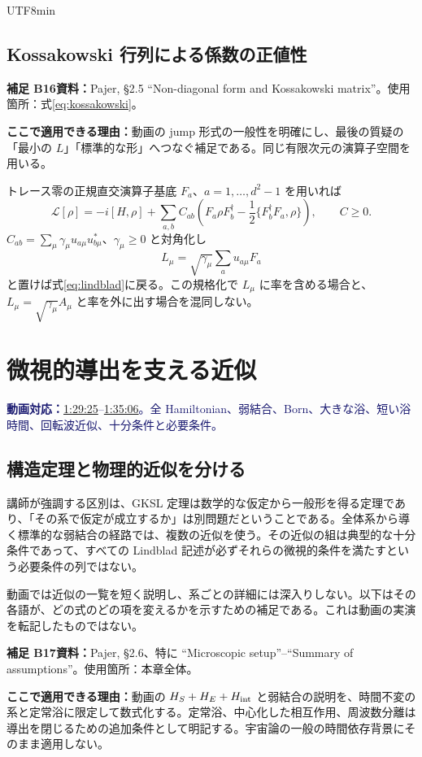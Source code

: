 \documentclass[11pt,a4paper]{article}
\numberwithin{equation}{section}
\newcommand{\vid}[2]{\href{https://www.youtube.com/watch?v=3gDSaNy1O7Y\&t=#1s}{#2}}
\newcommand{\source}[1]{\par\noindent\textcolor{MidnightBlue}{\textbf{動画対応：}#1}\par}
\newcommand{\supp}[3]{\par\smallskip\noindent\textcolor{BrickRed}{\textbf{補足 #1}}\quad\textbf{資料：}#2\par\noindent\textbf{ここで適用できる理由：}#3\par}
\begin{document}
\begin{CJK*}{UTF8}{min}
\subsection{Kossakowski 行列による係数の正値性}
\supp{B16}{Pajer\cite{pajer}, §2.5 ``Non-diagonal form and Kossakowski matrix''。使用箇所：式\eqref{eq:kossakowski}。}{動画の jump 形式の一般性を明確にし、最後の質疑の「最小の $L$」「標準的な形」へつなぐ補足である。同じ有限次元の演算子空間を用いる。}
トレース零の正規直交演算子基底 $F_a$、$a=1,\ldots,d^2-1$ を用いれば
\begin{equation}
\mathcal L[\rho]=-i[H,\rho]+\sum_{a,b}C_{ab}
\left(F_a\rho F_b^\dagger-\frac12\{F_b^\dagger F_a,\rho\}\right),
\qquad C\geq0.
\label{eq:kossakowski}
\end{equation}
$C_{ab}=\sum_\mu\gamma_\mu u_{a\mu}u_{b\mu}^*$、$\gamma_\mu\geq0$ と対角化し
\begin{equation}
L_\mu=\sqrt{\gamma_\mu}\sum_a u_{a\mu}F_a
\end{equation}
と置けば式\eqref{eq:lindblad}に戻る。この規格化で $L_\mu$ に率を含める場合と、$L_\mu=\sqrt{\gamma_\mu}A_\mu$ と率を外に出す場合を混同しない。

\section{微視的導出を支える近似}
\label{sec:micro}
\source{\vid{5365}{1:29:25}--\vid{5706}{1:35:06}。全 Hamiltonian、弱結合、Born、大きな浴、短い浴時間、回転波近似、十分条件と必要条件。}
\subsection{構造定理と物理的近似を分ける}
講師が強調する区別は、GKSL 定理は数学的な仮定から一般形を得る定理であり、「その系で仮定が成立するか」は別問題だということである。全体系から導く標準的な弱結合の経路では、複数の近似を使う。その近似の組は典型的な十分条件であって、すべての Lindblad 記述が必ずそれらの微視的条件を満たすという必要条件の列ではない。

動画では近似の一覧を短く説明し、系ごとの詳細には深入りしない。以下はその各語が、どの式のどの項を変えるかを示すための補足である。これは動画の実演を転記したものではない。

\supp{B17}{Pajer\cite{pajer}, §2.6、特に ``Microscopic setup''--``Summary of assumptions''。使用箇所：本章全体。}{動画の $H_S+H_E+H_{\rm int}$ と弱結合の説明を、時間不変の系と定常浴に限定して数式化する。定常浴、中心化した相互作用、周波数分離は導出を閉じるための追加条件として明記する。宇宙論の一般の時間依存背景にそのまま適用しない。}

\end{CJK*}
\end{document}
